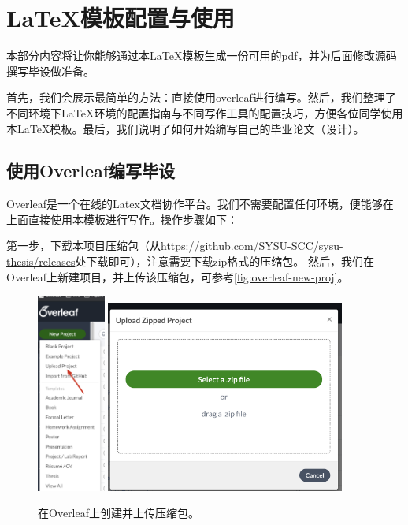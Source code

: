 \chapter{\LaTeX 模板配置与使用}


\label{cha:sysu-thesis-latex-install-guide}

本部分内容将让你能够通过本\LaTeX 模板生成一份可用的pdf，并为后面修改源码撰写毕设做准备。

首先，我们会展示最简单的方法：直接使用overleaf进行编写。然后，我们整理了不同环境下\LaTeX 环境的配置指南与不同写作工具的配置技巧，方便各位同学使用本\LaTeX 模板。最后，我们说明了如何开始编写自己的毕业论文（设计）。


\section{使用Overleaf编写毕设}

Overleaf是一个在线的Latex文档协作平台。我们不需要配置任何环境，便能够在上面直接使用本模板进行写作。操作步骤如下：

第一步，下载本项目压缩包（从\url{https://github.com/SYSU-SCC/sysu-thesis/releases}处下载即可），注意需要下载zip格式的压缩包。
然后，我们在Overleaf上新建项目，并上传该压缩包，可参考\autoref{fig:overleaf-new-proj}。


\begin{figure}[h]
	\centering
	\includegraphics[width=0.2\textwidth]{image/chap03/overleaf-create-proj.jpg}
	\includegraphics[width=0.7\textwidth]{image/chap03/overleaf-upload-proj.jpg}
	\caption{在Overleaf上创建并上传压缩包。}
 	\label{fig:overleaf-new-proj}
\end{figure}

